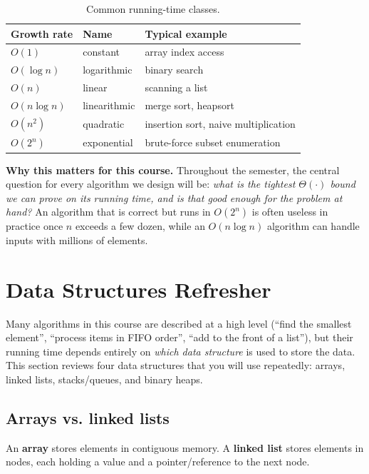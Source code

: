\documentclass[11pt]{article}
\begin{document}
\begin{table}[h]
\centering
\begin{tabular}{@{}lll@{}}
\toprule
Growth rate & Name & Typical example \\
\midrule
$O(1)$        & constant     & array index access \\
$O(\log n)$   & logarithmic  & binary search \\
$O(n)$        & linear       & scanning a list \\
$O(n \log n)$ & linearithmic & merge sort, heapsort \\
$O(n^2)$      & quadratic    & insertion sort, naive multiplication \\
$O(2^n)$      & exponential  & brute-force subset enumeration \\
\bottomrule
\end{tabular}
\caption{Common running-time classes.}
\end{table}

\textbf{Why this matters for this course.} Throughout the semester, the central question
for every algorithm we design will be: \emph{what is the tightest $\Theta(\cdot)$ bound we
can prove on its running time, and is that good enough for the problem at hand?} An
algorithm that is correct but runs in $O(2^n)$ is often useless in practice once $n$
exceeds a few dozen, while an $O(n \log n)$ algorithm can handle inputs with millions of
elements.

\section{Data Structures Refresher}

Many algorithms in this course are described at a high level (``find the smallest
element'', ``process items in FIFO order'', ``add to the front of a list''), but their
running time depends entirely on \emph{which data structure} is used to store the data.
This section reviews four data structures that you will use repeatedly: arrays, linked
lists, stacks/queues, and binary heaps.

\subsection{Arrays vs. linked lists}

An \textbf{array} stores elements in contiguous memory. A \textbf{linked list} stores
elements in nodes, each holding a value and a pointer/reference to the next node.
\end{document}
